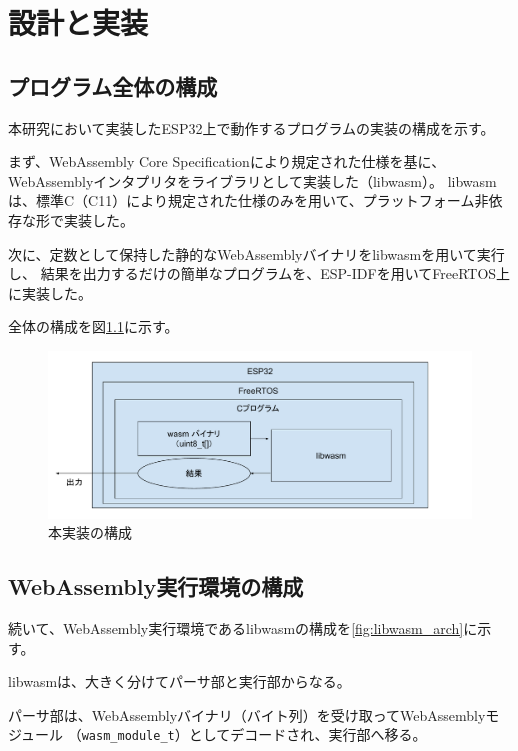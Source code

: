 \chapter{設計と実装}
\label{chap:implementation}

\section{プログラム全体の構成}

本研究において実装したESP32上で動作するプログラムの実装の構成を示す。

まず、WebAssembly Core Specification\cite{wasm_spec}により規定された仕様を基に、
WebAssemblyインタプリタをライブラリとして実装した（libwasm）。
libwasmは、標準C（C11）により規定された仕様のみを用いて、プラットフォーム非依存な形で実装した。

次に、定数として保持した静的なWebAssemblyバイナリをlibwasmを用いて実行し、
結果を出力するだけの簡単なプログラムを、ESP-IDF\cite{esp_idf}を用いてFreeRTOS上に実装した。

全体の構成を図\ref{fig:esp32_libwasm}に示す。

\begin{figure}[htbp]
  \caption{本実装の構成}
  \label{fig:esp32_libwasm}
  \begin{center}
    \includegraphics[bb=0 0 800 300,width=12cm]{img/esp32_libwasm.pdf}
  \end{center}
\end{figure}

\section{WebAssembly実行環境の構成}

続いて、WebAssembly実行環境であるlibwasmの構成を\ref{fig:libwasm_arch}に示す。

libwasmは、大きく分けてパーサ部と実行部からなる。

パーサ部は、WebAssemblyバイナリ（バイト列）を受け取ってWebAssemblyモジュール
（\verb|wasm_module_t|）としてデコードされ、実行部へ移る。


